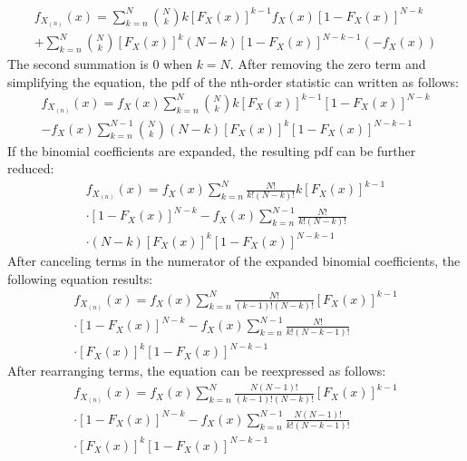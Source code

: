 \documentclass[conference]{IEEEtran}
\begin{document}
\begin{equation}
\begin{gathered}
f_{X_{(n)}}(x) = \sum_{k=n}^{N}\binom{N}{k}k[F_X(x)]^{k-1}f_X(x)[1-F_X(x)]^{N-k}\\
 + \sum_{k=n}^{N}\binom{N}{k}[F_X(x)]^{k}(N-k)[1-F_X(x)]^{N-k-1}(-f_X(x))
\end{gathered}
\end{equation}
The second summation is 0 when $k=N$. After removing the zero term and simplifying the equation, the pdf of the nth-order statistic can written as follows:
\begin{equation}
\begin{gathered}
f_{X_{(n)}}(x) = f_X(x)\sum_{k=n}^{N}\binom{N}{k}k[F_X(x)]^{k-1}[1-F_X(x)]^{N-k}\\
- f_X(x)\sum_{k=n}^{N-1}\binom{N}{k}(N-k)[F_X(x)]^{k}[1-F_X(x)]^{N-k-1}
\end{gathered}
\end{equation}
If the binomial coefficients are expanded, the resulting pdf can be further reduced:
\begin{equation}
\begin{gathered}
f_{X_{(n)}}(x) = f_X(x)\sum_{k=n}^{N}\frac{N!}{k!(N-k)!}k[F_X(x)]^{k-1}\\
\cdot[1-F_X(x)]^{N-k} - f_X(x)\sum_{k=n}^{N-1}\frac{N!}{k!(N-k)!}\\
\cdot(N-k)[F_X(x)]^{k}[1-F_X(x)]^{N-k-1}
\end{gathered}
\end{equation}
After canceling terms in the numerator of the expanded binomial coefficients, the following equation results:
\begin{equation}
\begin{gathered}
f_{X_{(n)}}(x) = f_X(x)\sum_{k=n}^{N}\frac{N!}{(k-1)!(N-k)!}[F_X(x)]^{k-1}\\
\cdot[1-F_X(x)]^{N-k} - f_X(x)\sum_{k=n}^{N-1}\frac{N!}{k!(N-k-1)!}\\
\cdot[F_X(x)]^{k}[1-F_X(x)]^{N-k-1}
\end{gathered}
\end{equation}
After rearranging terms, the equation can be reexpressed as follows:
\begin{equation}
\begin{gathered}
f_{X_{(n)}}(x) = f_X(x)\sum_{k=n}^{N}\frac{N(N-1)!}{(k-1)!(N-k)!}[F_X(x)]^{k-1}\\
\cdot[1-F_X(x)]^{N-k} - f_X(x)\sum_{k=n}^{N-1}\frac{N(N-1)!}{k!(N-k-1)!}\\
\cdot[F_X(x)]^{k}[1-F_X(x)]^{N-k-1}
\end{gathered}
\end{equation}
\end{document}
